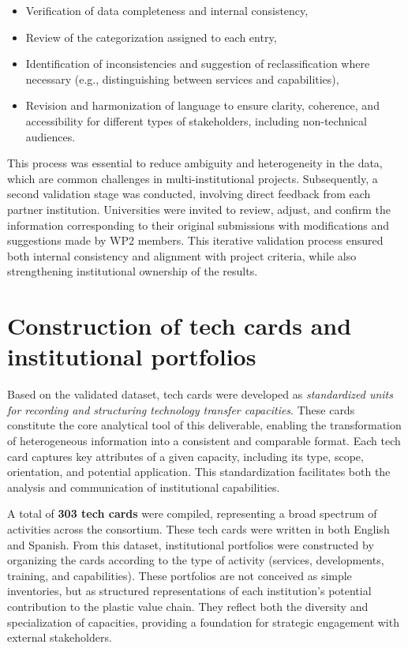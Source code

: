 \documentclass[
  12pt,
  oneside]{book}
\providecommand{\tightlist}{%
  \setlength{\itemsep}{0pt}\setlength{\parskip}{0pt}}
\begin{document}
\begin{itemize}
\tightlist
\item
  Verification of data completeness and internal consistency,
\item
  Review of the categorization assigned to each entry,
\item
  Identification of inconsistencies and suggestion of reclassification
  where necessary (e.g., distinguishing between services and
  capabilities),
\item
  Revision and harmonization of language to ensure clarity, coherence,
  and accessibility for different types of stakeholders, including
  non-technical audiences.
\end{itemize}

This process was essential to reduce ambiguity and heterogeneity in the
data, which are common challenges in multi-institutional projects.
Subsequently, a second validation stage was conducted, involving direct
feedback from each partner institution. Universities were invited to
review, adjust, and confirm the information corresponding to their
original submissions with modifications and suggestions made by WP2
members. This iterative validation process ensured both internal
consistency and alignment with project criteria, while also
strengthening institutional ownership of the results.

\section{Construction of tech cards and institutional
portfolios}\label{construction-of-tech-cards-and-institutional-portfolios}

Based on the validated dataset, tech cards were developed as
\emph{standardized units for recording and structuring technology
transfer capacities}. These cards constitute the core analytical tool of
this deliverable, enabling the transformation of heterogeneous
information into a consistent and comparable format. Each tech card
captures key attributes of a given capacity, including its type, scope,
orientation, and potential application. This standardization facilitates
both the analysis and communication of institutional capabilities.

A total of \textbf{303 tech cards} were compiled, representing a broad
spectrum of activities across the consortium. These tech cards were
written in both English and Spanish. From this dataset, institutional
portfolios were constructed by organizing the cards according to the
type of activity (services, developments, training, and capabilities).
These portfolios are not conceived as simple inventories, but as
structured representations of each institution's potential contribution
to the plastic value chain. They reflect both the diversity and
specialization of capacities, providing a foundation for strategic
engagement with external stakeholders.
\end{document}
